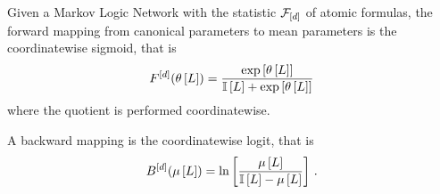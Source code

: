 \begin{theorem}
	Given a Markov Logic Network with the statistic $\mathcal{F}_{[d]}$ of atomic formulas, the forward mapping from canonical parameters to mean parameters is the coordinatewise sigmoid, that is
		\[ F^{[d]}(\theta\left[L\right]) = \frac{\mathrm{exp}\left[\theta\left[L\right]\right]}{\mathbb{I}\left[L\right]+\mathrm{exp}\left[\theta\left[L\right]\right]}   \]
	where the quotient is performed coordinatewise.

	A backward mapping is the coordinatewise logit, that is
		\[ B^{[d]}(\mu\left[L\right]) 
		= \ln \left[ \frac{
			\mu\left[L\right]
			}{
			\mathbb{I}\left[L\right]-\mu\left[L\right]
			} \right]  \, . \]
\end{theorem}

